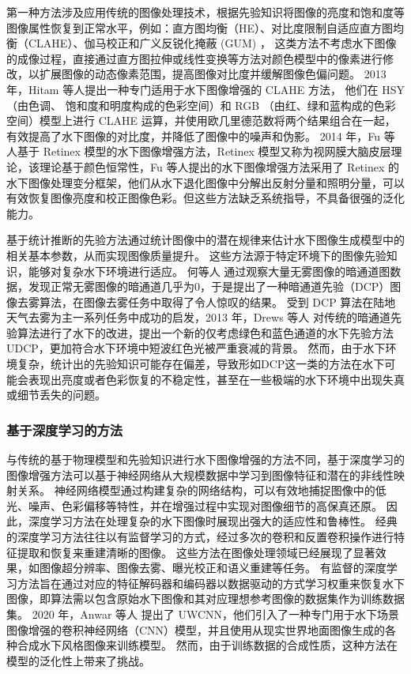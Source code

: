 第一种方法涉及应用传统的图像处理技术，根据先验知识将图像的亮度和饱和度等图像属性恢复到正常水平，例如：直方图均衡（HE）\cite{he}、对比度限制自适应直方图均衡（CLAHE）\cite{clahe}、伽马校正和广义反锐化掩蔽 (GUM) \cite{gum}，
这类方法不考虑水下图像的成像过程，直接通过直方图拉伸或线性变换等方法对颜色模型中的像素进行修改，以扩展图像的动态像素范围，提高图像对比度并缓解图像色偏问题。
2013 年，Hitam 等人\cite{mixture_clahe}提出一种专门适用于水下图像增强的 CLAHE 方法， 他们在 HSY （由色调、 饱和度和明度构成的色彩空间）和 RGB （由红、绿和蓝构成的色彩空间）模型上进行 CLAHE 运算，并使用欧几里德范数将两个结果组合在一起，有效提高了水下图像的对比度，并降低了图像中的噪声和伪影。
2014 年，Fu 等人\cite{uw_retinex}基于 Retinex 模型的水下图像增强方法，Retinex 模型又称为视网膜大脑皮层理论，该理论基于颜色恒常性，Fu 等人提出的水下图像增强方法采用了 Retinex 的水下图像处理变分框架，他们从水下退化图像中分解出反射分量和照明分量，可以有效恢复图像亮度和校正图像色彩。但这些方法缺乏系统指导，不具备很强的泛化能力。

基于统计推断的先验方法通过统计图像中的潜在规律来估计水下图像生成模型中的相关基本参数，从而实现图像质量提升。
这些方法源于特定环境下的图像先验知识，能够对复杂水下环境进行适应。
何等人 \cite{dcp} 通过观察大量无雾图像的暗通道图数据，发现正常无雾图像的暗通道几乎为0，于是提出了一种暗通道先验（DCP）图像去雾算法，在图像去雾任务中取得了令人惊叹的结果。
受到 DCP 算法在陆地天气去雾为主一系列任务中成功的启发，2013 年，Drews 等人 \cite{udcp}对传统的暗通道先验算法进行了水下的改进，提出一个新的仅考虑绿色和蓝色通道的水下先验方法 UDCP，更加符合水下环境中短波红色光被严重衰减的背景。
然而，由于水下环境复杂，统计出的先验知识可能存在偏差，导致形如DCP这一类的方法在水下可能会表现出亮度或者色彩恢复的不稳定性，甚至在一些极端的水下环境中出现失真或细节丢失的问题。

\subsubsection{基于深度学习的方法}
与传统的基于物理模型和先验知识进行水下图像增强的方法不同，基于深度学习的图像增强方法可以基于神经网络从大规模数据中学习到图像特征和潜在的非线性映射关系。
神经网络模型通过构建复杂的网络结构，可以有效地捕捉图像中的低光、噪声、色彩偏移等特性，并在增强过程中实现对图像细节的高保真还原。
因此，深度学习方法在处理复杂的水下图像时展现出强大的适应性和鲁棒性。
经典的深度学习方法往往以有监督学习的方式，经过多次的卷积和反置卷积操作进行特征提取和恢复来重建清晰的图像。
这些方法在图像处理领域已经展现了显著效果，如图像超分辨率\cite{cyberCSRnet}、图像去雾\cite{QCNN_H}、曝光校正\cite{Exposure_restoration}和语义重建\cite{InpaintingMissingArea}等任务。
有监督的深度学习方法旨在通过对应的特征解码器和编码器以数据驱动的方式学习权重来恢复水下图像，即算法需以包含原始水下图像和其对应理想参考图像的数据集作为训练数据集。
2020 年，Anwar 等人 \cite{uwcnn}提出了 UWCNN，他们引入了一种专门用于水下场景图像增强的卷积神经网络（CNN）模型，并且使用从现实世界地面图像生成的各种合成水下风格图像来训练模型。
然而，由于训练数据的合成性质，这种方法在模型的泛化性上带来了挑战。

